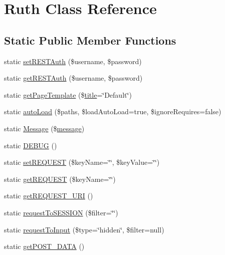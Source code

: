 \hypertarget{classRuth}{}\section{Ruth Class Reference}
\label{classRuth}
\subsection*{Static Public Member Functions}
\begin{DoxyCompactItemize}
\item 
static \hyperlink{classRuth_ad43f0c266cd72d1f3d26442528570d38}{set\+R\+E\+S\+T\+Auth} (\$username, \$password)
\item 
static \hyperlink{classRuth_ac185be50454d3107da9eb3fe45503b48}{get\+R\+E\+S\+T\+Auth} (\$username, \$password)
\item 
static \hyperlink{classRuth_ac470a420ccefd668c3a50bead17e2d8a}{get\+Page\+Template} (\$\hyperlink{Shape_8php_ad264ad0cabbe965bf7f7c8a5ed6abebb}{title}=\char`\"{}Default\char`\"{})
\item 
static \hyperlink{classRuth_a0d04b422b261fcbf033abfe6b77d5a2d}{auto\+Load} (\$paths, \$load\+Auto\+Load=true, \$ignore\+Requires=false)
\item 
static \hyperlink{classRuth_a6322471f9832f6b0c92e8d321956874c}{Message} (\$\hyperlink{Tessa_8php_a37ab31c170417027f819bfc053d7cd39}{message})
\item 
static \hyperlink{classRuth_aa0e8f0a163756675b0ec431bb7dd0b49}{D\+E\+B\+U\+G} ()
\item 
static \hyperlink{classRuth_a0fc75ae6b986d7109f66f659cf1dcac2}{set\+R\+E\+Q\+U\+E\+S\+T} (\$key\+Name=\char`\"{}\char`\"{}, \$key\+Value=\char`\"{}\char`\"{})
\item 
static \hyperlink{classRuth_abe809de9dafced3724124f3399af01f3}{get\+R\+E\+Q\+U\+E\+S\+T} (\$key\+Name=\char`\"{}\char`\"{})
\item 
static \hyperlink{classRuth_a0a05421198533990654d0c1fb0beaffd}{get\+R\+E\+Q\+U\+E\+S\+T\+\_\+\+U\+R\+I} ()
\item 
static \hyperlink{classRuth_a627fd70f5f186ba0d4d3dc187a432b81}{request\+To\+S\+E\+S\+S\+I\+O\+N} (\$filter=\char`\"{}\char`\"{})
\item 
static \hyperlink{classRuth_ae10d9c25d1910e59a15662dd1304c23b}{request\+To\+Input} (\$type=\char`\"{}hidden\char`\"{}, \$filter=null)
\item 
static \hyperlink{classRuth_addbd05bd71b3abeff8e8250c46897e5b}{get\+P\+O\+S\+T\+\_\+\+D\+A\+T\+A} ()

\end{DoxyCompactItemize}
